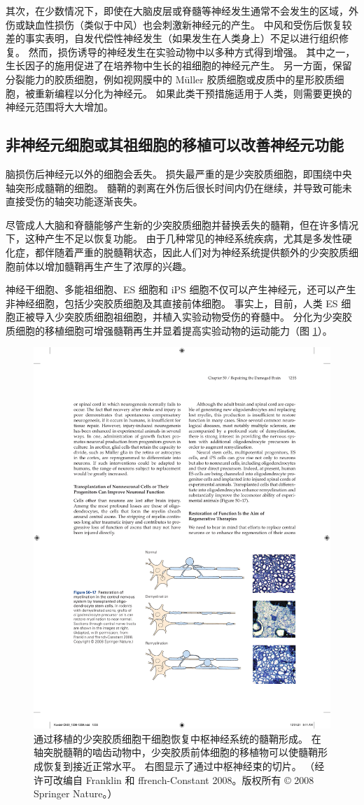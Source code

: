 其次，在少数情况下，即使在大脑皮层或脊髓等神经发生通常不会发生的区域，外伤或缺血性损伤（类似于中风）也会刺激新神经元的产生。 中风和受伤后恢复较差的事实表明，自发代偿性神经发生（如果发生在人类身上）不足以进行组织修复。 然而，损伤诱导的神经发生在实验动物中以多种方式得到增强。 其中之一，生长因子的施用促进了在培养物中生长的祖细胞的神经元产生。 另一方面，保留分裂能力的胶质细胞，例如视网膜中的 Müller 胶质细胞或皮质中的星形胶质细胞，被重新编程以分化为神经元。 如果此类干预措施适用于人类，则需要更换的神经元范围将大大增加。

\subsection{非神经元细胞或其祖细胞的移植可以改善神经元功能}
脑损伤后神经元以外的细胞会丢失。 损失最严重的是少突胶质细胞，即围绕中央轴突形成髓鞘的细胞。 髓鞘的剥离在外伤后很长时间内仍在继续，并导致可能未直接受伤的轴突功能逐渐丧失。

尽管成人大脑和脊髓能够产生新的少突胶质细胞并替换丢失的髓鞘，但在许多情况下，这种产生不足以恢复功能。 由于几种常见的神经系统疾病，尤其是多发性硬化症，都伴随着严重的脱髓鞘状态，因此人们对为神经系统提供额外的少突胶质细胞前体以增加髓鞘再生产生了浓厚的兴趣。

神经干细胞、多能祖细胞、ES 细胞和 iPS 细胞不仅可以产生神经元，还可以产生非神经细胞，包括少突胶质细胞及其直接前体细胞。 事实上，目前，人类 ES 细胞正被导入少突胶质细胞祖细胞，并植入实验动物受伤的脊髓中。 
分化为少突胶质细胞的移植细胞可增强髓鞘再生并显着提高实验动物的运动能力（图 \ref{fig:50_17}）。

\begin{figure}[htbp]
	\centering
	\includegraphics[width=0.75\linewidth]{chap50/fig_50_17}
	\caption{通过移植的少突胶质细胞干细胞恢复中枢神经系统的髓鞘形成。 在轴突脱髓鞘的啮齿动物中，少突胶质前体细胞的移植物可以使髓鞘形成恢复到接近正常水平。 右图显示了通过中枢神经束的切片。 （经许可改编自 Franklin 和 ffrench-Constant 2008。版权所有 © 2008 Springer Nature。）}
	\label{fig:50_17}
\end{figure}

